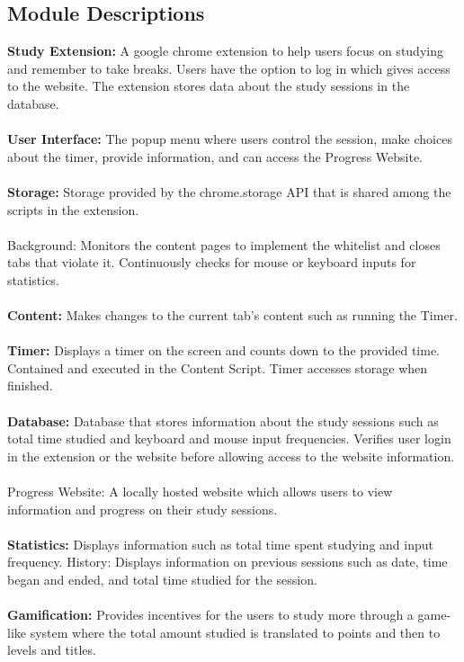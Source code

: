 \documentclass[12pt]{article}
\begin{document}
\subsection{Module Descriptions}
\textbf{Study Extension:} A google chrome extension to help users focus on studying and remember to take breaks. Users have the option to log in which gives access to the website. The extension stores data about the study sessions in the database. \\\\
\textbf{User Interface:} The popup menu where users control the session, make choices about the timer, provide information, and can access the Progress Website.\\\\
\textbf{Storage:} Storage provided by the chrome.storage API that is shared among the scripts in the extension.\\\\
Background: Monitors the content pages to implement the whitelist and closes tabs that violate it. Continuously checks for mouse or keyboard inputs for statistics.\\\\
\textbf{Content:} Makes changes to the current tab's content such as running the Timer.\\\\
\textbf{Timer:} Displays a timer on the screen and counts down to the provided time. Contained and executed in the Content Script. Timer accesses storage when finished.\\\\
\textbf{Database:} Database that stores information about the study sessions such as total time studied and keyboard and mouse input frequencies. Verifies user login in the extension or the website before allowing access to the website information. \\\\
Progress Website: A locally hosted website which allows users to view information and progress on their study sessions. \\\\
\textbf{Statistics:} Displays information such as total time spent studying and input frequency. 
History: Displays information on previous sessions such as date, time began and ended, and total time studied for the session. \\\\
\textbf{Gamification:} Provides incentives for the users to study more through a game-like system where the total amount studied is translated to points and then to levels and titles.\\\\
\end{document}
